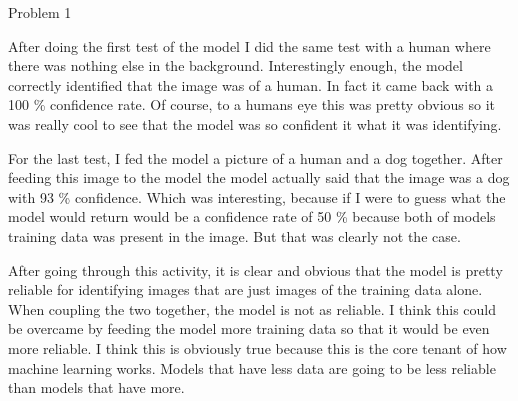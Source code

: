 \begin{problem}{Problem 1}
\begin{Highlight}[Solution]
\begin{spacing}{1.50}
            After doing the first test of the model I did the same test with a human where there was nothing else in the background. Interestingly enough, the model correctly identified that the image
            was of a human. In fact it came back with a 100 \% confidence rate. Of course, to a humans eye this was pretty obvious so it was really cool to see that the model was so confident it what it was
            identifying.

            For the last test, I fed the model a picture of a human and a dog together. After feeding this image to the model the model actually said that the image was a dog with 93 \% confidence. Which
            was interesting, because if I were to guess what the model would return would be a confidence rate of 50 \% because both of models training data was present in the image. But that was clearly not
            the case.

            After going through this activity, it is clear and obvious that the model is pretty reliable for identifying images that are just images of the training data alone. When coupling the two together,
            the model is not as reliable. I think this could be overcame by feeding the model more training data so that it would be even more reliable. I think this is obviously true because this is the core
            tenant of how machine learning works. Models that have less data are going to be less reliable than models that have more.
        \end{spacing}
        \vspace*{-0.5em}
    \end{Highlight}
\end{problem}


